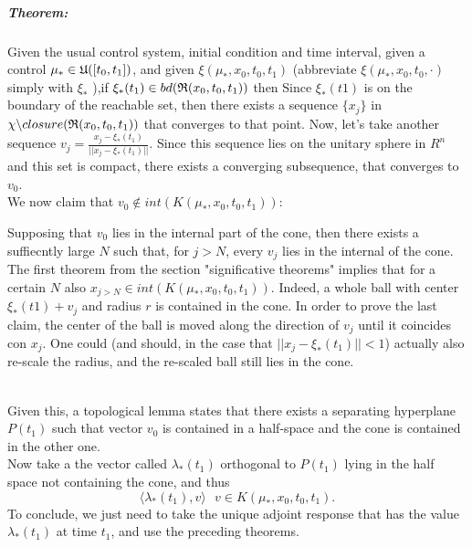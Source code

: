 \subparagraph[5.16]{Theorem:} Given the usual control system, initial condition and time interval, given a control $\mu_*\in\mathfrak{U}([t_0,t_1])$, and given $\xi(\mu_*,x_0,t_0,t_1)$ (abbreviate $\xi(\mu_*,x_0,t_0,\cdot)$ simply with $\xi_*$ ),if $\xi_*(t_1) \in bd(\mathfrak{R}(x_0,t_0,t_1))$ then 
 Since $\xi_*(t1)$ is on the boundary of the reachable set, then there exists a sequence $\{x_j\}$ in $\chi\backslash closure(\mathfrak{R}(x_0,t_0,t_1))$ that converges to that point. Now, let's take another sequence $v_j=\frac{x_j-\xi_*(t_1)}{||x_j-\xi_*(t_1)||}$. Since this sequence lies on the unitary sphere in $R^{n}$ and this set is compact, there exists a converging subsequence, that converges to $v_0$.\\
We now claim that $v_0\notin int(K(\mu_*,x_0,t_0,t_1))$:\\
\begin{minipage}{0.15\linewidth}
	 \mbox{}
\end{minipage}
\begin{minipage}{0.8\linewidth}
	 Supposing that $v_0$ lies in the internal part of the cone, then there exists a suffiecntly large $N$ such that, for $j>N$, every $v_j$ lies in the internal of the cone. The first theorem from the section "significative theorems" implies that for a certain $N$ also $x_{j>N}\in int(K(\mu_*,x_0,t_0,t_1))$. Indeed, a whole ball with center $\xi_*(t1)+v_j$ and radius $r$ is contained in the cone. In order to prove the last claim, the center of the ball is moved along the direction of $v_j$ until it coincides con $x_j$. One could (and should, in the case that $||x_j-\xi_*(t_1)||<1$) actually also re-scale the radius, and the re-scaled ball still lies in the cone. 
\end{minipage}\\
Given this, a topological lemma states that there exists a separating hyperplane $P(t_1)$ such that vector $v_0$ is contained in a half-space and the cone is contained in the other one.\\
Now take a the vector called $\lambda_*(t_1)$ orthogonal to $P(t_1)$ lying in the half space not containing the cone, and thus \[\langle \lambda_*(t_1),v\rangle\text{      }v\in K(\mu_*,x_0,t_0,t_1).\]
To conclude, we just need to take the unique adjoint response that has the value $\lambda_*(t_1)$ at time $t_1$, and use the preceding theorems. 

